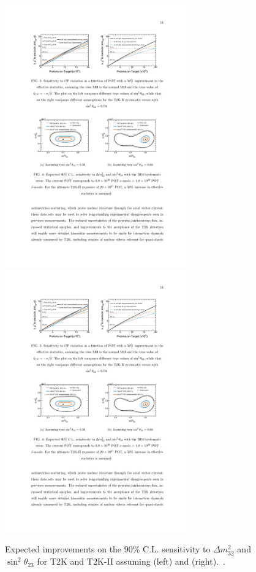 \begin{figure} [htbp!]
\begin{center}
\includegraphics[width=8cm]{figures/t2kpre_t23dm32_point1_wreactorthrow.pdf}
\includegraphics[width=8cm]{figures/t2kpre_t23dm32_point2_wreactorthrow.pdf}
\caption{\label{fig:t2k2th23} Expected improvements on the 90\% C.L. sensitivity to $\Delta m^2_{32}$ and $\sin^2\theta_{23}$
for T2K and T2K-II assuming  (left) and  (right).~\cite{Abe:2016tez}.}
\end{center}
\end{figure}

